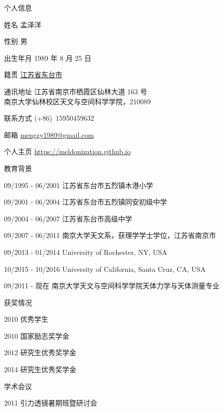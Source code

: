 \begin{resume}

\begin{cv}{}
\begin{cvlist}{个人信息}
\setlength{\itemsep}{-0.250\baselineskip plus 0.2em minus 0.2em}
\item[姓名] 孟泽洋 
\item[性别] 男
\item[出生年月] 1989 年 8 月 25 日
\item[籍贯]  \href{https://goo.gl/maps/rJ1jvfKt65z}{江苏省东台市}
\item[通讯地址]  江苏省南京市栖霞区仙林大道 163 号 \\
 			 南京大学仙林校区天文与空间科学学院，210089 
\item[联系方式]   (+86)~15950459632
\item[邮箱] \href{mailto:mengzy1989@gmail.com}{mengzy1989@gmail.com}
\item[个人主页]  \url{https://meldonization.github.io}
\end{cvlist}
\begin{cvlist}{教育背景}
\setlength{\itemsep}{-0.250\baselineskip plus 0.2em minus 0.2em}
\item[09/1995 - 06/2001] 江苏省东台市五烈镇木港小学
\item[09/2001 - 06/2004] 江苏省东台市五烈镇同安初级中学
\item[09/2004 - 06/2007] 江苏省东台市高级中学
\item[09/2007 - 06/2011] 南京大学天文系，获理学学士学位，江苏省南京市
\item[09/2013 - 01/2014] University of Rochester, NY, USA
\item[10/2015 - 10/2016] University of California, Santa Cruz, CA, USA
\item[09/2011 - 现在]  南京大学天文与空间科学学院天体力学与天体测量专业
\end{cvlist}
\begin{cvlist}{获奖情况}
\setlength{\itemsep}{-0.250\baselineskip plus 0.2em minus 0.2em}
\item[2010]  优秀学生
\item[2010]  国家励志奖学金
\item[2012]  研究生优秀奖学金
\item[2014]  研究生优秀奖学金
\end{cvlist}
\begin{cvlist}{学术会议}
\setlength{\itemsep}{-0.250\baselineskip plus 0.2em minus 0.2em}
\item[2011]   引力透镜暑期班暨研讨会

\end{cvlist}
\end{cv}
\end{resume}
